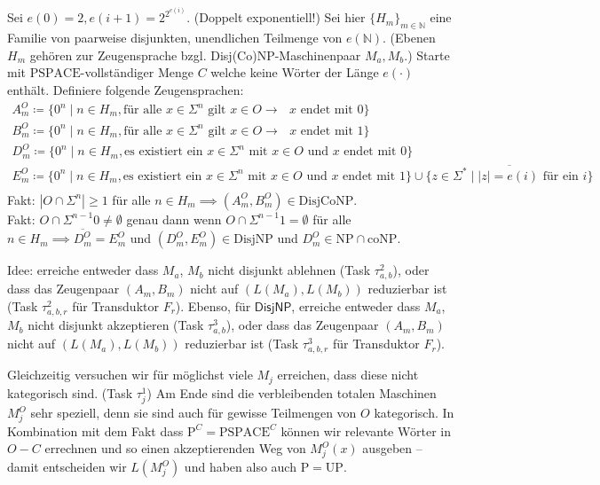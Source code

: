 \documentclass[nofonts]{uebung}
\def\P{\ensuremath{\mathrm{P}}}
\def\NP{\ensuremath{\mathrm{NP}}}
\def\UP{\ensuremath{\mathrm{UP}}}
\def\DisjNP{\ensuremath{\mathrm{DisjNP}}}
\def\DisjCoNP{\ensuremath{\mathrm{DisjCoNP}}}
\def\coNP{\ensuremath{\mathrm{coNP}}}
\def\hDisjNP{\ensuremath{\mathsf{DisjNP}}}
\begin{document}
Sei $e(0)=2, e(i+1)=2^{2^{e(i)}}$. (Doppelt exponentiell!) Sei hier $\{H_m\}_{m\in\mathbb N}$ eine Familie von paarweise disjunkten, unendlichen Teilmenge von $e(\mathbb N)$. (Ebenen $H_m$ gehören zur Zeugensprache bzgl. Disj(Co)NP-Maschinenpaar $M_a, M_b$.)
Starte mit $\mathrm{PSPACE}$-vollständiger Menge $C$ welche keine Wörter der Länge $e(\cdot)$ enthält.
Definiere folgende Zeugensprachen:
\begin{gather*}
    A_m^O \coloneqq \{ 0^n \mid n\in H_m, \text{für alle $x\in \Sigma^{n}$ gilt } x\in O \rightarrow \text{ $x$ endet mit $0$} \}\\
    B_m^O \coloneqq \{ 0^n \mid n\in H_m, \text{für alle $x\in \Sigma^{n}$ gilt } x\in O \rightarrow \text{ $x$ endet mit $1$} \}\\
    D_m^O \coloneqq \{ 0^n \mid n\in H_m, \text{es existiert ein $x\in \Sigma^{n}$ mit $x\in O$ und $x$ endet mit $0$} \}\\
    E_m^O \coloneqq \{ 0^n \mid n\in H_m, \text{es existiert ein $x\in \Sigma^{n}$ mit $x\in O$ und $x$ endet mit $1$} \} \cup \overline{\{ z\in\Sigma^* \mid |z|=e(i) \text{ für ein $i$} \}}\\
\end{gather*}
Fakt: $|O\cap \Sigma^n|\geq 1$ für alle $n\in H_m \implies (A_m^O, B_m^O)\in\DisjCoNP$.\\
Fakt: $O\cap \Sigma^{n-1}0\neq\emptyset$ genau dann wenn  $O\cap \Sigma^{n-1}1=\emptyset$ für alle $n\in H_m \implies \overline{D_m^O}=E_m^O$ und $(D_m^O, E_m^O)\in\DisjNP$ und $D_m^O\in\NP\cap\coNP$.
\medskip

Idee: erreiche entweder dass $M_a$, $M_b$ nicht disjunkt ablehnen (Task $\tau^2_{a,b}$), oder dass das Zeugenpaar $(A_m,B_m)$ nicht auf $(L(M_a),L(M_b))$ reduzierbar ist (Task $\tau^2_{a,b,r}$ für Transduktor $F_r$).
Ebenso, für $\hDisjNP$, erreiche entweder dass $M_a$, $M_b$ nicht disjunkt akzeptieren (Task $\tau^3_{a,b}$), oder dass das Zeugenpaar $(A_m,B_m)$ nicht auf $(L(M_a),L(M_b))$ reduzierbar ist (Task $\tau^3_{a,b,r}$ für Transduktor $F_r$).

Gleichzeitig versuchen wir für möglichst viele $M_j$ erreichen, dass diese nicht kategorisch sind. (Task $\tau^1_j$)
Am Ende sind die verbleibenden totalen Maschinen $M^O_j$ sehr speziell, denn sie sind auch für gewisse Teilmengen von $O$ kategorisch.
In Kombination mit dem Fakt dass $\P^C=\mathrm{PSPACE}^C$ können wir relevante Wörter in $O-C$ errechnen und so einen akzeptierenden Weg von $M^O_j(x)$ ausgeben -- damit entscheiden wir $L(M^O_j)$ und haben also auch $\P=\UP$.
\medskip
\end{document}
